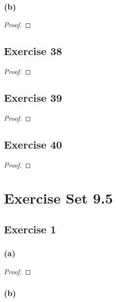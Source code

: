 \documentclass[14pt]{extarticle}
\begin{document}
\subsubsection{(b)}

\begin{proof}

\end{proof}

\subsection{Exercise 38}

\begin{proof}

\end{proof}

\subsection{Exercise 39}

\begin{proof}

\end{proof}

\subsection{Exercise 40}

\begin{proof}

\end{proof}

\section{Exercise Set 9.5}

\subsection{Exercise 1}

\subsubsection{(a)}

\begin{proof}

\end{proof}

\subsubsection{(b)}
\end{document}
